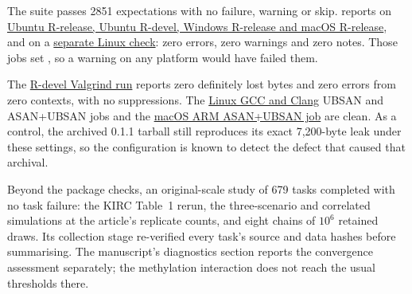 The suite passes 2851 expectations with no failure, warning or skip.
 reports  on
\href{https://github.com/h7nian/IntegMultiReg/actions/runs/36508516101}{Ubuntu
R-release, Ubuntu R-devel, Windows R-release and macOS R-release}, and on a
\href{https://github.com/h7nian/IntegMultiReg/actions/runs/36508516112}{separate
Linux check}: zero errors, zero warnings and zero notes. Those jobs set
, so a warning on any platform would have failed
them.

The \href{https://github.com/h7nian/IntegMultiReg/actions/runs/36508516050}{R-devel
Valgrind run} reports zero definitely lost bytes and zero errors from zero
contexts, with no suppressions. The
\href{https://github.com/h7nian/IntegMultiReg/actions/runs/36508516113}{Linux
GCC and Clang} UBSAN and ASAN+UBSAN jobs and the
\href{https://github.com/h7nian/IntegMultiReg/actions/runs/36508516172}{macOS ARM
ASAN+UBSAN job} are clean. As a control, the archived 0.1.1 tarball still
reproduces its exact 7,200-byte leak under these settings, so the configuration
is known to detect the defect that caused that archival.

Beyond the package checks, an original-scale study of 679 tasks completed with
no task failure: the KIRC Table~1 rerun, the three-scenario and correlated
simulations at the article's replicate counts, and eight chains of $10^{6}$
retained draws. Its collection stage re-verified every task's source and data
hashes before summarising. The manuscript's diagnostics section reports the
convergence assessment separately; the methylation interaction does not reach
the usual thresholds there.
